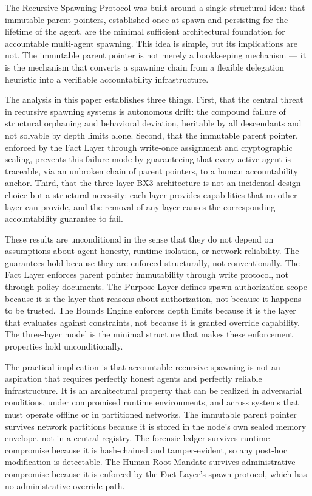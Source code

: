 The Recursive Spawning Protocol was built around a single structural idea: that immutable parent pointers, established once at spawn and persisting for the lifetime of the agent, are the minimal sufficient architectural foundation for accountable multi-agent spawning. This idea is simple, but its implications are not. The immutable parent pointer is not merely a bookkeeping mechanism --- it is the mechanism that converts a spawning chain from a flexible delegation heuristic into a verifiable accountability infrastructure.

The analysis in this paper establishes three things. First, that the central threat in recursive spawning systems is autonomous drift: the compound failure of structural orphaning and behavioral deviation, heritable by all descendants and not solvable by depth limits alone. Second, that the immutable parent pointer, enforced by the Fact Layer through write-once assignment and cryptographic sealing, prevents this failure mode by guaranteeing that every active agent is traceable, via an unbroken chain of parent pointers, to a human accountability anchor. Third, that the three-layer BX3 architecture is not an incidental design choice but a structural necessity: each layer provides capabilities that no other layer can provide, and the removal of any layer causes the corresponding accountability guarantee to fail.

These results are unconditional in the sense that they do not depend on assumptions about agent honesty, runtime isolation, or network reliability. The guarantees hold because they are enforced structurally, not conventionally. The Fact Layer enforces parent pointer immutability through write protocol, not through policy documents. The Purpose Layer defines spawn authorization scope because it is the layer that reasons about authorization, not because it happens to be trusted. The Bounds Engine enforces depth limits because it is the layer that evaluates against constraints, not because it is granted override capability. The three-layer model is the minimal structure that makes these enforcement properties hold unconditionally.

The practical implication is that accountable recursive spawning is not an aspiration that requires perfectly honest agents and perfectly reliable infrastructure. It is an architectural property that can be realized in adversarial conditions, under compromised runtime environments, and across systems that must operate offline or in partitioned networks. The immutable parent pointer survives network partitions because it is stored in the node's own sealed memory envelope, not in a central registry. The forensic ledger survives runtime compromise because it is hash-chained and tamper-evident, so any post-hoc modification is detectable. The Human Root Mandate survives administrative compromise because it is enforced by the Fact Layer's spawn protocol, which has no administrative override path.

